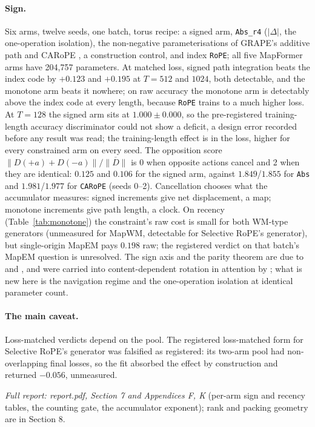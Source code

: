 \documentclass[10pt]{article}
\newcommand{\arm}[1]{\texttt{#1}}
\begin{document}
\paragraph{Sign.} Six arms, twelve seeds, one batch, torus recipe: a signed arm, \arm{Abs\_r4} ($|\Delta|$, the
one-operation isolation), the non-negative parameterisations of GRAPE's additive path and CARoPE
\citep{veisi2025carope}, a construction control, and index \arm{RoPE}; all five MapFormer arms have 204,757
parameters. At matched loss, signed path integration beats the index code by $+0.123$ and $+0.195$ at $T=512$ and
$1024$, both detectable, and the monotone arm beats it nowhere; on raw accuracy the monotone arm is
detectably above the index code at every length, because \arm{RoPE} trains to a much higher loss. At $T=128$ the
signed arm sits at $1.000\pm0.000$, so the pre-registered training-length accuracy discriminator could not show a
deficit, a design error recorded before any result was read; the training-length effect is in the loss, higher
for every constrained arm on every seed. The opposition score $\|D(+a)+D(-a)\|/\overline{\|D\|}$ is 0 when
opposite actions cancel and 2 when they are identical: $0.125$ and $0.106$ for the signed arm, against
$1.849$/$1.855$ for \arm{Abs} and $1.981$/$1.977$ for \arm{CARoPE} (seeds 0--2). Cancellation chooses what the
accumulator measures: signed increments give net displacement, a map; monotone increments give path length, a
clock. On recency (Table~\ref{tab:monotone}) the constraint's raw cost is small for both WM-type generators (unmeasured for
MapWM, detectable for Selective RoPE's generator), but single-origin MapEM pays $0.198$ raw; the registered verdict on that batch's MapEM question is unresolved. The sign
axis and the parity theorem are due to \citet{sarrof2024expressive} and \citet{grazzi2025unlocking}, and were
carried into content-dependent rotation in attention by \citet{movahedi2026srope}; what is new here is the
navigation regime and the one-operation isolation at identical parameter count.

\paragraph{The main caveat.} Loss-matched verdicts depend on the pool. The registered loss-matched form for
Selective RoPE's generator was falsified as registered: its two-arm pool had non-overlapping final losses, so the
fit absorbed the effect by construction and returned $-0.056$, unmeasured.

\noindent\emph{Full report: report.pdf, Section 7 and Appendices F, K} (per-arm sign and recency tables, the
counting gate, the accumulator exponent); rank and packing geometry are in Section 8.
\end{document}
